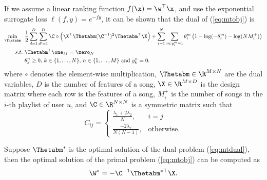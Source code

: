 If we assume a linear ranking function $f(\x) = \w^\top \x$, 
and use the exponential surrogate loss $\ell(f, y) = e^{-fy}$,
it can be shown that the dual of (\ref{eq:mtobj}) is
\begin{equation}
\label{eq:mtdual}
\begin{aligned}
\min_{\Thetabm} \ \ & \frac{1}{2} \sum_{d=1}^{D} \sum_{d'=1}^{D} \C \circ \left( \X^\top \Thetabm (\C^{-1})^2 \Thetabm^\top \X \right) 
    + \sum_{i = 1}^{N} \sum_{m: y_i^m = 1} \theta_i^m \left( 1 - \log(-\theta_i^m) - \log(N M_i^+) \right) \\
s.t. \ & \Thetabm^\top \one_M = \zero_{N} \\
       & \theta_k^n \ge 0, \, k \in \{1,\dots,N\}, \, n \in \{1,\dots,M\} \ \mathrm{and} \ y_k^n = 0.
\end{aligned}
\end{equation}
where $\circ$ denotes the element-wise multiplication,
$\Thetabm \in \R^{M \times N}$ are the dual variables, $D$ is the number of features of a song, 
$\X \in \R^{M \times D}$ is the design matrix where each row is the features of a song,
$M_i^+$ is the number of songs in the $i$-th playlist of user $u$,
and $\C \in \R^{N \times N}$ is a symmetric matrix such that
\begin{equation*}
C_{ij} = \begin{cases}
\frac{\lambda_1 + 2\lambda_2}{N}, & i = j \\
\frac{-2\lambda_2}{N (N - 1)},  & \mathrm{otherwise}.
\end{cases}
\end{equation*}

Suppose $\Thetabm^*$ is the optimal solution of the dual problem (\ref{eq:mtdual}), 
then the optimal solution of the primal problem (\ref{eq:mtobj}) can be computed as
\begin{equation*}
\W^* = -\C^{-1} \Thetabm^{*\top} \X.
\end{equation*}



